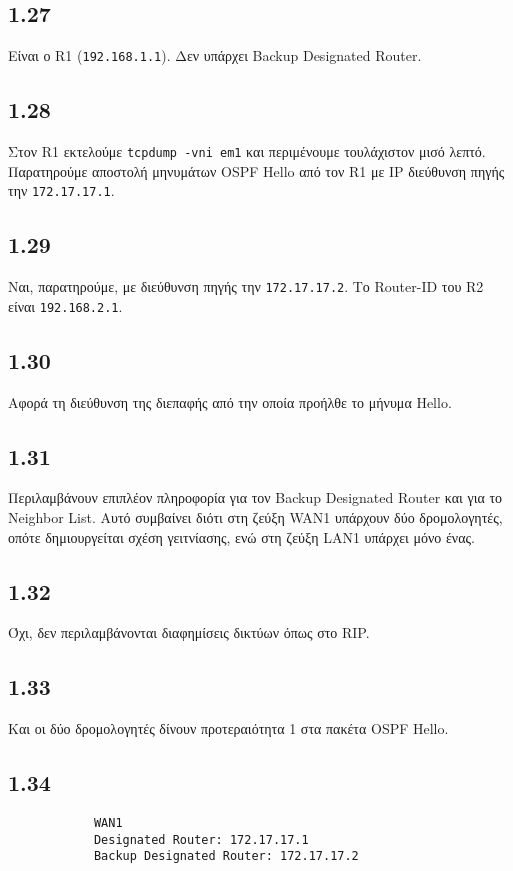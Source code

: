 \documentclass[a4paper, 12pt]{article}
\begin{document}
	\subsection*{1.27}
		Είναι ο R1 (\verb|192.168.1.1|). Δεν υπάρχει Backup Designated Router.

	\subsection*{1.28}
		Στον R1 εκτελούμε \verb|tcpdump -vni em1| και περιμένουμε τουλάχιστον μισό λεπτό. Παρατηρούμε αποστολή μηνυμάτων OSPF Hello από τον R1 με IP διεύθυνση πηγής την \verb|172.17.17.1|.

	\subsection*{1.29} 
		Ναι, παρατηρούμε, με διεύθυνση πηγής την \verb|172.17.17.2|. Το Router-ID του R2 είναι \verb|192.168.2.1|.

	\subsection*{1.30}
		Αφορά τη διεύθυνση της διεπαφής από την οποία προήλθε το μήνυμα Hello.

	\subsection*{1.31}
		Περιλαμβάνουν επιπλέον πληροφορία για τον Backup Designated Router και για το Neighbor List. Αυτό συμβαίνει διότι στη ζεύξη WAN1 υπάρχουν δύο δρομολογητές, οπότε δημιουργείται σχέση γειτνίασης, ενώ στη ζεύξη LAN1 υπάρχει μόνο ένας.

	\subsection*{1.32}
		Όχι, δεν περιλαμβάνονται διαφημίσεις δικτύων όπως στο RIP.

	\subsection*{1.33}
		Και οι δύο δρομολογητές δίνουν προτεραιότητα 1 στα πακέτα OSPF Hello.

	\subsection*{1.34}
		\begin{verbatim}
			WAN1
			Designated Router: 172.17.17.1
			Backup Designated Router: 172.17.17.2
		\end{verbatim}
		
\end{document}
